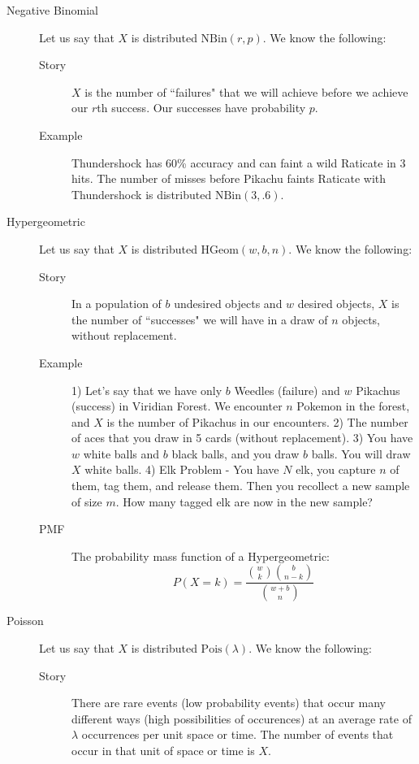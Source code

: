 \documentclass[10pt,landscape]{article}
\theoremstyle{definition}
\newcommand{\Pois}{\textrm{Pois}}
\newcommand{\NBin}{\textrm{NBin}}
\newcommand{\Hypergeometric}{\textrm{HGeom}}
\begin{document}
\begin{multicols}{3}
\begin{description}
\item[Negative Binomial] Let us say that $X$ is distributed $\NBin(r, p)$. We know the following:
\begin{description}
    \item[Story] $X$ is the number of ``failures" that we will achieve before we achieve our $r$th success. Our successes have probability $p$.
    \item[Example] Thundershock has 60\% accuracy and can faint a wild Raticate in 3 hits. The number of misses before Pikachu faints Raticate with Thundershock is distributed $\NBin(3, .6)$.
\end{description}

\item[Hypergeometric] Let us say that $X$ is distributed $\Hypergeometric(w, b, n)$. We know the following:
\begin{description}
    \item[Story] In a population of $b$ undesired objects and $w$ desired objects, $X$ is the number of ``successes" we will have in a draw of $n$ objects, without replacement.
    \item[Example] 1) Let's say that we have only $b$ Weedles (failure) and $w$ Pikachus (success) in Viridian Forest. We encounter $n$ Pokemon in the forest, and $X$ is the number of Pikachus in our encounters. 2) The number of aces that you draw in 5 cards (without replacement). 3) You have $w$ white balls and $b$ black balls, and you draw $b$ balls. You will draw $X$ white balls. 4) Elk Problem - You have $N$ elk, you capture $n$ of them, tag them, and release them. Then you recollect a new sample of size $m$. How many tagged elk are now in the new sample?
    \item[PMF] The probability mass function of a Hypergeometric:
\[P(X = k) = \frac{{w \choose k}{b \choose n-k}}{{w + b \choose n}}\]
\end{description}


\item[Poisson] Let us say that $X$ is distributed $\Pois(\lambda)$. We know the following:
\begin{description}
    \item[Story] There are rare events (low probability events) that occur many different ways (high possibilities of occurences) at an average rate of $\lambda$ occurrences per unit space or time. The number of events that occur in that unit of space or time is $X$.
    

\end{description}
\end{description}
\end{multicols}
\end{document}
